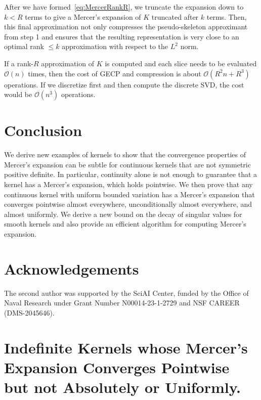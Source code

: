 \documentclass{article}
\begin{document}
After we have formed~\cref{eq:MercerRankR}, we truncate the expansion down to $k<R$ terms to give a Mercer's expansion of $K$ truncated after $k$ terms. Then, this final approximation not only compresses the pseudo-skeleton approximant from step 1 and ensures that the resulting representation is very close to an optimal rank $\leq k$ approximation with respect to the $L^2$ norm. 

If a rank-$R$ approximation of $K$ is computed and each slice needs to be evaluated $\mathcal{O}(n)$ times, then the cost of GECP and compression is about $\mathcal{O}(R^2n + R^3)$ operations. If we discretize first and then compute the discrete SVD, the cost would be $\mathcal{O}(n^3)$ operations.

\section{Conclusion}

We derive new examples of kernels to show that the convergence properties of Mercer's expansion can be subtle for continuous kernels that are not symmetric positive definite. In particular, continuity alone is not enough to guarantee that a kernel has a Mercer's expansion, which holds pointwise.  We then prove that any continuous kernel with uniform bounded variation has a Mercer's expansion that converges pointwise almost everywhere, unconditionally almost everywhere, and almost uniformly. We derive a new bound on the decay of singular values for smooth kernels and also provide an efficient algorithm for computing Mercer's expansion. 

\section{Acknowledgements} The second author was supported by the SciAI Center, funded by the Office of Naval Research under Grant Number N00014-23-1-2729 and NSF CAREER (DMS-2045646).











\appendix

\section{Indefinite Kernels whose Mercer's Expansion Converges Pointwise but not Absolutely or Uniformly. }\label{sec:proofexamples}
\end{document}
